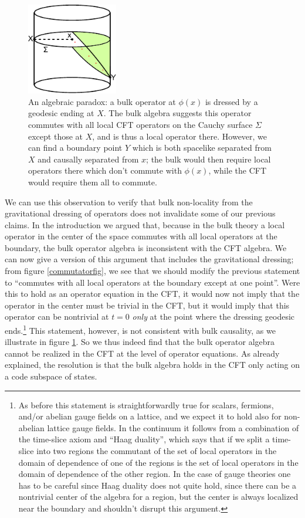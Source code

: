 \documentclass[11pt]{article}
\begin{document}
\begin{figure}
\begin{center}
\includegraphics[height=4cm]{causality.pdf}
\caption{An algebraic paradox: a bulk operator at $\phi(x)$ is dressed by a geodesic ending at $X$.  The bulk algebra suggests this operator commutes with all local CFT operators on the Cauchy surface $\Sigma$ except those at $X$, and is thus a local operator there. However, we can find a boundary point $Y$ which is both spacelike separated from $X$ and causally separated from $x$; the bulk would then require local operators there which don't commute with $\phi(x)$, while the CFT would require them all to commute.}\label{causality}
\end{center}
\end{figure}
We can use this observation to verify that bulk non-locality from the gravitational dressing of operators does not invalidate some of our previous claims.  In the introduction we argued that, because in the bulk theory a local operator in the center of the space commutes with all local operators at the boundary, the bulk operator algebra is inconsistent with the CFT algebra.  We can now give a version of this argument that includes the gravitational dressing; from figure \ref{commutatorfig}, we see that we should modify the previous statement to ``commutes with all local operators at the boundary except at one point''.  Were this to hold as an operator equation in the CFT, it would now not imply that the operator in the center must be trivial in the CFT, but it would imply that this operator can be nontrivial at $t=0$ \textit{only} at the point where the dressing geodesic ends.\footnote{As before this statement is straightforwardly true for scalars, fermions, and/or abelian gauge fields on a lattice, and we expect it to hold also for non-abelian lattice gauge fields.  In the continuum it follows from a combination of the time-slice axiom and ``Haag duality'', which says that if we split a time-slice into two regions the commutant of the set of local operators in the domain of dependence of one of the regions is the set of local operators in the domain of dependence of the other region.  In the case of gauge theories one has to be careful since Haag duality does not quite hold, since there can be a nontrivial center of the algebra for a region, but the center is always localized near the boundary \cite{Casini:2013rba} and shouldn't disrupt this argument.}  This statement, however, is not consistent with bulk causality, as we illustrate in figure \ref{causality}.  So we thus indeed find that the bulk operator algebra cannot be realized in the CFT at the level of operator equations.  As already explained, the resolution is that the bulk algebra holds in the CFT only acting on a code subspace of states.  
\end{document}
